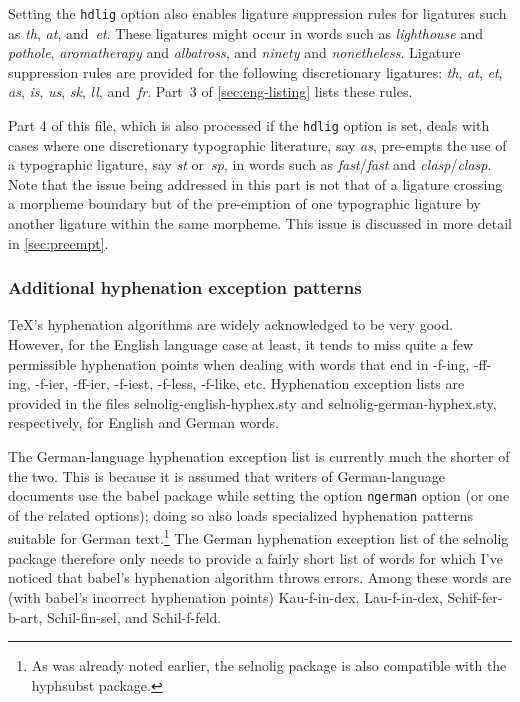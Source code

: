 \documentclass[12pt]{article}
\newcommand{\pkg}[1]{\textsf{#1}}
\newcommand{\opt}[1]{\texttt{#1}}
\begin{document}
Setting the \opt{hdlig} option also enables ligature suppression rules for ligatures such as \emph{th}, \emph{at}, and~\emph{et}. These ligatures might occur in words such as \emph{ligh\mbox{th}ouse} and \emph{po\mbox{th}ole}, \emph{arom\mbox{at}herapy} and \emph{alb\mbox{at}ross}, and \emph{nin\mbox{et}y} and \emph{non\mbox{et}heless}. Ligature suppression rules are provided for the following discretionary ligatures: \emph{th}, \emph{at}, \emph{et}, \emph{as}, \emph{is}, \emph{us}, {\ebg \emph{sk}},  \emph{ll}, and~\emph{fr}. Part~3 of \cref{sec:eng-listing} lists these rules.

Part 4 of this file, which is also processed if the \opt{hdlig} option is set, deals with cases where one discretionary typographic literature, say \emph{as}, pre-empts the use of a typographic ligature, say \emph{st} or~\emph{sp}, in words such as \emph{f\mbox{as}t}\slash \emph{fa\mbox{st}} and \emph{cl\mbox{as}p}\slash \emph{cla\mbox{sp}}. Note that the issue being addressed in this part is not that of a ligature crossing a morpheme boundary but of the pre-emption of one typographic ligature by another ligature within the same morpheme. This issue is discussed in more detail in \cref{sec:preempt}.



\subsubsection{Additional hyphenation exception patterns} \label{sec:addlhyph}

\TeX's hyphenation algorithms are widely acknowledged to be very good. However, for the English language case at least, it tends to miss quite a few permissible hyphenation points when dealing with words that end in -f-ing, -ff-ing, -f-ier, -ff-ier, -f-iest, -f-less, -f-like, etc. Hyphenation exception lists are provided in the files \pkg{selnolig-english-hyphex.sty} and \pkg{selnolig-german-hyphex.sty}, respectively, for English and German words.

The German-language hyphenation exception list is currently much the shorter of the two. This is because it is assumed that writers of German-language documents use the \pkg{babel} package while setting the option \opt{ngerman} option (or one of the related options); doing so also loads specialized hyphenation patterns suitable for German text.\footnote{As was already noted earlier, the \pkg{selnolig} package is also compatible with the \pkg{hyphsubst} package.} The German hyphenation exception list of the \pkg{selnolig} package therefore only needs to provide a fairly short list of words for which I've noticed that \pkg{babel}'s hyphenation algorithm throws errors. Among these words are (with \pkg{babel}'s incorrect hyphenation points) Kau-f-in-dex, Lau-f-in-dex, Schif-fer-b-art, Schil-fin-sel, and Schil-f-feld.
\end{document}
